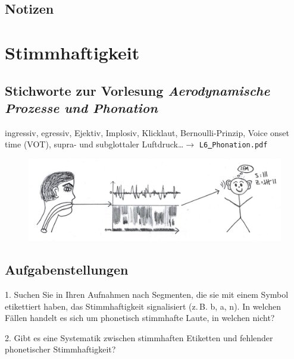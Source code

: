 \documentclass[11pt]{book}
\begin{document}
\section{Notizen}
\vspace*{10cm}






\chapter{Stimmhaftigkeit}

\section{Stichworte zur Vorlesung \em{Aerodynamische Prozesse und Phonation}}

ingressiv, egressiv, Ejektiv, Implosiv, Klicklaut, Bernoulli-Prinzip, Voice onset time (VOT), supra- und subglottaler Luftdruck\dots $\rightarrow$ {\tt L6\underline{\ }Phonation.pdf}

\begin{figure}[htbp]
\begin{center}
\includegraphics[width=\textwidth]{grafiken/stimmhaftigkeit/stimmhaftigkeit}
\label{t4}
\end{center}
\end{figure}


\newpage
\section{Aufgabenstellungen}

1.	Suchen Sie in Ihren Aufnahmen nach Segmenten, die sie mit einem Symbol etikettiert haben, das Stimmhaftigkeit signalisiert (z.\,B. b, a, n). In welchen Fällen handelt es sich um phonetisch stimmhafte Laute, in welchen nicht?
\vspace{4cm}

2.	Gibt es eine Systematik zwischen stimmhaften Etiketten und fehlender phonetischer Stimmhaftigkeit?
\vspace{4cm}
\end{document}
